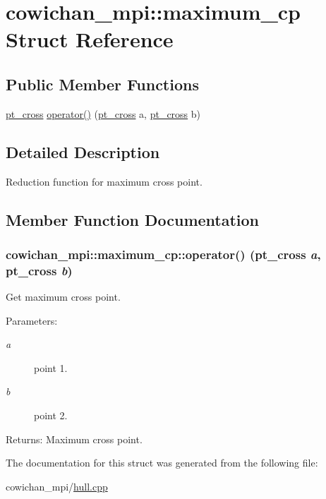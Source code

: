\hypertarget{structcowichan__mpi_1_1maximum__cp}{
\section{cowichan\_\-mpi::maximum\_\-cp Struct Reference}
\label{structcowichan__mpi_1_1maximum__cp}
}
\subsection*{Public Member Functions}
\begin{CompactItemize}
\item 
\hyperlink{structcowichan__mpi_1_1pt__cross}{pt\_\-cross} \hyperlink{structcowichan__mpi_1_1maximum__cp_4750f0e492fc75ebe72dc6238f48738a}{operator()} (\hyperlink{structcowichan__mpi_1_1pt__cross}{pt\_\-cross} a, \hyperlink{structcowichan__mpi_1_1pt__cross}{pt\_\-cross} b)
\end{CompactItemize}


\subsection{Detailed Description}
Reduction function for maximum cross point. 

\subsection{Member Function Documentation}
\hypertarget{structcowichan__mpi_1_1maximum__cp_4750f0e492fc75ebe72dc6238f48738a}{
\subsubsection[{operator()}]{ cowichan\_\-mpi::maximum\_\-cp::operator() ({\bf pt\_\-cross} {\em a}, \/  {\bf pt\_\-cross} {\em b})}}
\label{structcowichan__mpi_1_1maximum__cp_4750f0e492fc75ebe72dc6238f48738a}


Get maximum cross point. \begin{Desc}
\item[Parameters:]
\begin{description}
\item[{\em a}]point 1. \item[{\em b}]point 2. \end{description}
\end{Desc}
\begin{Desc}
\item[Returns:]Maximum cross point. \end{Desc}


The documentation for this struct was generated from the following file:\begin{CompactItemize}
\item 
cowichan\_\-mpi/\hyperlink{cowichan__mpi_2hull_8cpp}{hull.cpp}\end{CompactItemize}
